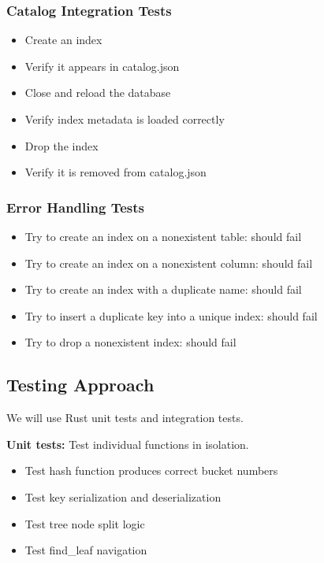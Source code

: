 \documentclass[11pt,a4paper]{article}
\begin{document}
\subsubsection{Catalog Integration Tests}

\begin{itemize}
\item Create an index
\item Verify it appears in catalog.json
\item Close and reload the database
\item Verify index metadata is loaded correctly
\item Drop the index
\item Verify it is removed from catalog.json
\end{itemize}

\subsubsection{Error Handling Tests}

\begin{itemize}
\item Try to create an index on a nonexistent table: should fail
\item Try to create an index on a nonexistent column: should fail
\item Try to create an index with a duplicate name: should fail
\item Try to insert a duplicate key into a unique index: should fail
\item Try to drop a nonexistent index: should fail
\end{itemize}

\subsection{Testing Approach}

We will use Rust unit tests and integration tests.

\textbf{Unit tests:} Test individual functions in isolation.
\begin{itemize}
\item Test hash function produces correct bucket numbers
\item Test key serialization and deserialization
\item Test tree node split logic
\item Test find\_leaf navigation
\end{itemize}
\end{document}
